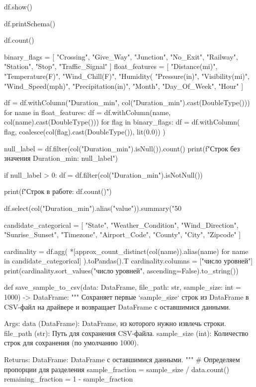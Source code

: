 \begin{code}
df.show()

df.printSchema()

df.count()

binary_flags = [
    "Crossing", "Give_Way", "Junction", "No_Exit",
    "Railway", "Station", "Stop", "Traffic_Signal"
]
float_features = [
    "Distance(mi)", "Temperature(F)", "Wind_Chill(F)", "Humidity(%
    "Pressure(in)", "Visibility(mi)", "Wind_Speed(mph)", "Precipitation(in)",
    "Month", "Day_Of_Week", "Hour"
]

df = df.withColumn("Duration_min", col("Duration_min").cast(DoubleType()))
for name in float_features:
    df = df.withColumn(name, col(name).cast(DoubleType()))
for flag in binary_flags:
    df = df.withColumn(
        flag,
        coalesce(col(flag).cast(DoubleType()), lit(0.0))
    )

null_label = df.filter(col("Duration_min").isNull()).count()
print(f"Строк без значения Duration_min: {null_label}")

if null_label > 0:
    df = df.filter(col("Duration_min").isNotNull())

print(f"Строк в работе: {df.count()}")

df.select(col("Duration_min").alias("value")).summary("50%

candidate_categorical = [
    "State", "Weather_Condition", "Wind_Direction", "Sunrise_Sunset",
    "Timezone", "Airport_Code", "County", "City", "Zipcode"
]

cardinality = df.agg(
    *[approx_count_distinct(col(name)).alias(name) for name in candidate_categorical]
).toPandas().T
cardinality.columns = ["число уровней"]
print(cardinality.sort_values("число уровней", ascending=False).to_string())

def save_sample_to_csv(data: DataFrame, file_path: str,
                       sample_size: int = 1000) -> DataFrame:
    """
    Сохраняет первые `sample_size` строк из DataFrame в CSV-файл на драйвере
    и возвращает DataFrame с оставшимися данными.

    Args:
        data (DataFrame): DataFrame, из которого нужно извлечь строки.
        file_path (str): Путь для сохранения CSV-файла.
        sample_size (int): Количество строк для сохранения
            (по умолчанию 1000).

    Returns:
        DataFrame: DataFrame с оставшимися данными.
    """
    # Определяем пропорции для разделения
    sample_fraction = sample_size / data.count()
    remaining_fraction = 1 - sample_fraction


\end{code}
